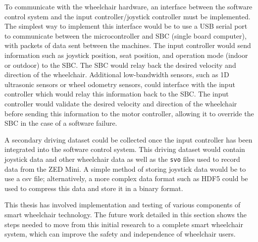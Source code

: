 To communicate with the wheelchair hardware, an interface between the software control system and the
input controller/joystick controller must be implemented. The simplest way to implement this
interface would be to use a USB serial port to communicate between the microcontroller and
SBC (single board computer), with packets of data sent between the machines.
The input controller would send information such as joystick position,
seat position, and operation mode (indoor or outdoor) to the SBC. The SBC would relay back the
desired velocity and direction of the wheelchair. Additional low-bandwidth sensors, such as
1D ultrasonic sensors or wheel odometry sensors, could interface with the input controller
which would relay this information back to the SBC. The input controller would validate
the desired velocity and direction of the wheelchair before sending this information
to the motor controller, allowing it to override the SBC in the case of a software failure.

A secondary driving dataset could be collected once the input controller has been integrated into
the software control system. This driving dataset would contain joystick data and other wheelchair data
as well as the \texttt{svo} files used to record data from the ZED Mini. A simple method of storing joystick
data would be to use a csv file; alternatively, a more complex data format such as HDF5 could be used
to compress this data and store it in a binary format.

This thesis has involved implementation and testing
of various components of smart wheelchair technology. The future work detailed in
this section shows the steps needed to move from this initial research to a complete
smart wheelchair system, which can improve the safety and independence of wheelchair users.




